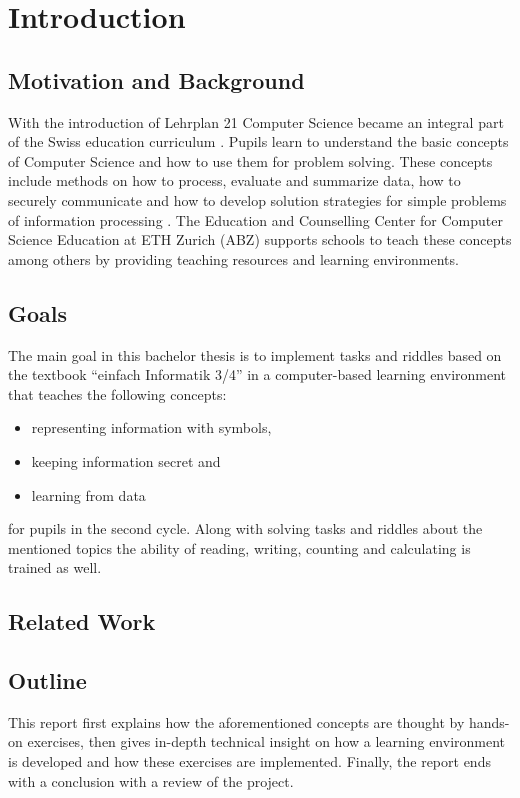 \chapter{Introduction}

\section{Motivation and Background}

With the introduction of Lehrplan 21 Computer Science became an integral part of the Swiss education curriculum \cite{Lehrplan21}. Pupils learn to understand the basic concepts of Computer Science and how to use them for problem solving. These concepts include methods on how to process, evaluate and summarize data, how to securely communicate and how to develop solution strategies for simple problems of information processing \cite{MedienUndInformatik}. The Education and Counselling Center for Computer Science Education at ETH Zurich (ABZ) supports schools to teach these concepts among others by providing teaching resources and learning environments.

\section{Goals}

The main goal in this bachelor thesis is to implement tasks and riddles based on the textbook “einfach Informatik 3/4” in a computer-based learning environment that teaches the following concepts:
\begin{itemize}
    \item representing information with symbols,
    \item keeping information secret and
    \item learning from data
\end{itemize}
for pupils in the second cycle.
Along with solving tasks and riddles about the mentioned topics the ability of reading, writing, counting and calculating is trained as well.

\section{Related Work}


\section{Outline}

This report first explains how the aforementioned concepts are thought by hands-on exercises, then gives in-depth technical insight on how a learning environment is developed and how these exercises are implemented. Finally, the report ends with a conclusion with a review of the project.
